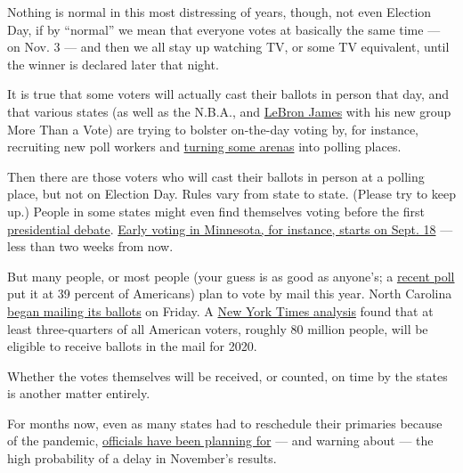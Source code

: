 Nothing is normal in this most distressing of years, though, not even
Election Day, if by ``normal'' we mean that everyone votes at basically
the same time --- on Nov. 3 --- and then we all stay up watching TV, or
some TV equivalent, until the winner is declared later that night.

It is true that some voters will actually cast their ballots in person
that day, and that various states (as well as the N.B.A., and
\href{https://www.nytimes3xbfgragh.onion/2020/08/24/us/politics/lebron-james-poll-workers.html}{LeBron
James} with his new group More Than a Vote) are trying to bolster
on-the-day voting by, for instance, recruiting new poll workers and
\href{https://www.nytimes3xbfgragh.onion/2020/08/28/sports/basketball/nba-playoffs-resume.html}{turning
some arenas} into polling places.

Then there are those voters who will cast their ballots in person at a
polling place, but not on Election Day. Rules vary from state to state.
(Please try to keep up.) People in some states might even find
themselves voting before the first
\href{https://www.nytimes3xbfgragh.onion/2020/09/02/business/media/trump-biden-debate-moderators.html}{presidential
debate}.
\href{https://www.npr.org/2020/09/04/909597279/voting-season-begins-north-carolina-mails-out-first-ballots}{Early
voting in Minnesota, for instance, starts on Sept. 18} --- less than two
weeks from now.

But many people, or most people (your guess is as good as anyone's; a
\href{https://www.opinium.com/resource-center/biden-leads-trump-by-wide-margin-in-august/}{recent
poll} put it at 39 percent of Americans) plan to vote by mail this year.
North Carolina
\href{https://www.nytimes3xbfgragh.onion/interactive/2020/08/31/us/politics/vote-by-mail-deadlines.html}{began
mailing its ballots} on Friday. A
\href{https://www.nytimes3xbfgragh.onion/interactive/2020/08/11/us/politics/vote-by-mail-us-states.html}{New
York Times analysis} found that at least three-quarters of all American
voters, roughly 80 million people, will be eligible to receive ballots
in the mail for 2020.

Whether the votes themselves will be received, or counted, on time by
the states is another matter entirely.

For months now, even as many states had to reschedule their primaries
because of the pandemic,
\href{https://www.nytimes3xbfgragh.onion/2020/06/24/us/politics/november-2020-election-day-results.html}{officials
have been planning for} --- and warning about --- the high probability
of a delay in November's results.

